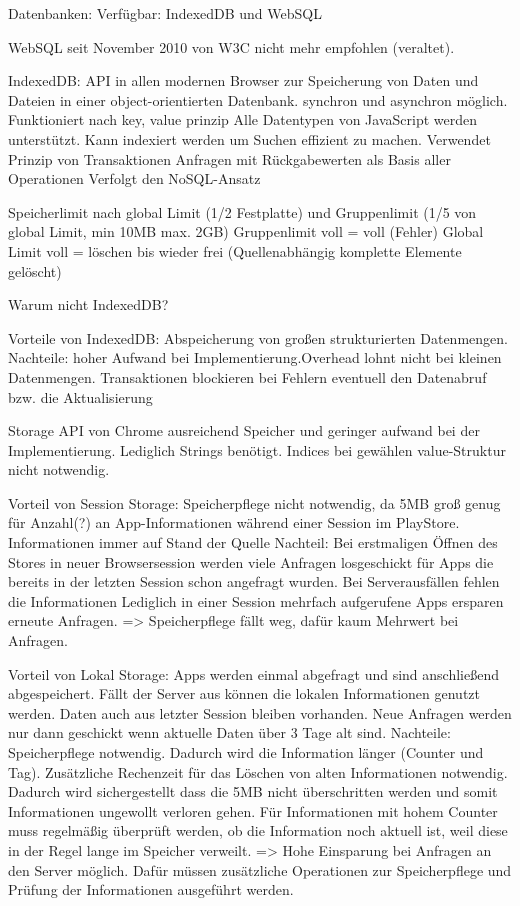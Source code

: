Datenbanken:
Verfügbar: IndexedDB und WebSQL

WebSQL seit November 2010 von W3C nicht mehr empfohlen (veraltet).

IndexedDB: API in allen modernen Browser zur Speicherung von Daten und Dateien in einer object-orientierten Datenbank.
synchron und asynchron möglich.
Funktioniert nach key, value prinzip
Alle Datentypen von JavaScript werden unterstützt.
Kann indexiert werden um Suchen effizient zu machen.
Verwendet Prinzip von Transaktionen
Anfragen mit Rückgabewerten als Basis aller Operationen
Verfolgt den NoSQL-Ansatz


Speicherlimit nach global Limit (1/2 Festplatte) und Gruppenlimit (1/5 von global Limit, min 10MB max. 2GB)
Gruppenlimit voll = voll (Fehler)
Global Limit voll = löschen bis wieder frei (Quellenabhängig komplette Elemente gelöscht)

Warum nicht IndexedDB?

Vorteile von IndexedDB: Abspeicherung von großen strukturierten Datenmengen.
Nachteile: hoher Aufwand bei Implementierung.Overhead lohnt nicht bei kleinen Datenmengen. Transaktionen blockieren bei Fehlern  eventuell den Datenabruf bzw. die Aktualisierung

Storage API von Chrome ausreichend Speicher und geringer aufwand bei der Implementierung. Lediglich Strings benötigt. Indices bei gewählen value-Struktur nicht notwendig.

Vorteil von Session Storage: Speicherpflege nicht notwendig, da 5MB groß genug für Anzahl(?) an App-Informationen während einer Session im PlayStore. Informationen immer auf Stand der Quelle
Nachteil: Bei erstmaligen Öffnen des Stores in neuer Browsersession werden viele Anfragen losgeschickt für Apps die bereits in der letzten Session schon angefragt wurden. Bei Serverausfällen fehlen die Informationen
Lediglich in einer Session mehrfach aufgerufene Apps ersparen erneute Anfragen.
=> Speicherpflege fällt weg, dafür kaum Mehrwert bei Anfragen.

Vorteil von Lokal Storage: Apps werden einmal abgefragt und sind anschließend abgespeichert. Fällt der Server aus können die lokalen Informationen genutzt werden. Daten auch aus letzter Session bleiben vorhanden. Neue Anfragen werden nur dann geschickt wenn aktuelle Daten über 3 Tage alt sind.
Nachteile: Speicherpflege notwendig. Dadurch wird die Information länger (Counter und Tag). Zusätzliche Rechenzeit für das Löschen von alten Informationen notwendig. Dadurch wird sichergestellt dass die 5MB nicht überschritten werden und somit Informationen ungewollt verloren gehen. Für Informationen mit hohem Counter muss regelmäßig überprüft werden, ob die Information noch aktuell ist, weil diese in der Regel lange im Speicher verweilt.
=> Hohe Einsparung bei Anfragen an den Server möglich. Dafür müssen zusätzliche Operationen zur Speicherpflege und Prüfung der Informationen ausgeführt werden.

